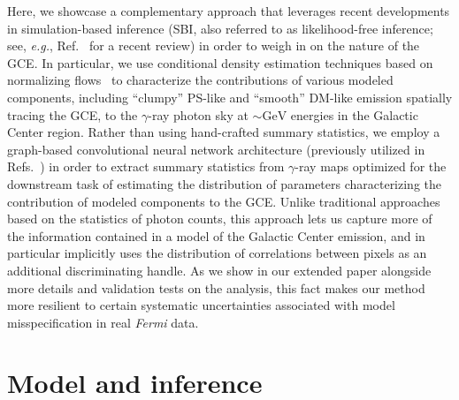 \documentclass[]{article}
\newcommand{\Fermi}{\emph{Fermi}\xspace}
\begin{document}
Here, we showcase a complementary approach that leverages recent developments in simulation-based inference (SBI, also referred to as likelihood-free inference; see, \emph{e.g.}, Ref.~\cite{cranmer2020frontier} for a recent review)
in order to weigh in on the nature of the GCE. In particular, we use conditional density estimation techniques based on normalizing flows~\cite{papamakarios2019normalizing,rezende2015variational} to characterize the contributions of various modeled components, including ``clumpy'' PS-like and ``smooth'' DM-like emission spatially tracing the GCE, to the $\gamma$-ray photon sky at $\sim\mathrm{GeV}$ energies in the Galactic Center region. Rather than using hand-crafted summary statistics, we employ a graph-based convolutional neural network architecture (previously utilized in Refs.~\cite{List:2020mzd,List:2021aer}) in order to extract summary statistics from $\gamma$-ray maps optimized for the downstream task of estimating the distribution of parameters characterizing the contribution of modeled components to the GCE. Unlike traditional approaches based on the statistics of photon counts, this approach lets us capture more of the information contained in a model of the Galactic Center emission, and in particular implicitly uses the distribution of correlations between pixels as an additional discriminating handle. As we show in our extended paper alongside more details and validation tests on the analysis, this fact makes our method more resilient to certain systematic uncertainties associated with model misspecification in real \Fermi data.

\section{Model and inference}
\label{sec:model}
\end{document}
